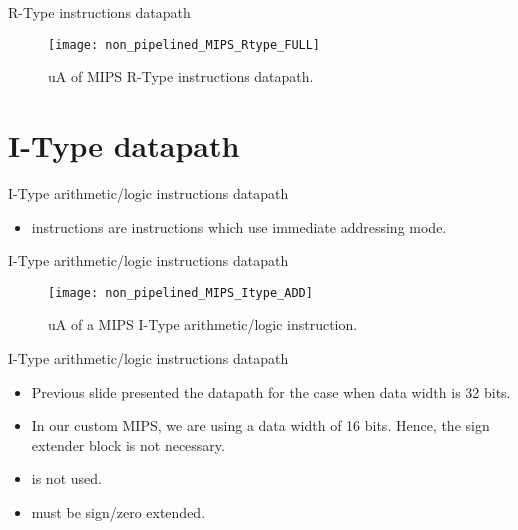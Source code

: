 % 
\begin{frame}{R-Type instructions datapath}
\vspace{-6.22pt}
  \begin{figure}
  \centering
  \texttt{[image: non\_pipelined\_MIPS\_Rtype\_FULL]}
  \vspace{-3pt}
  \caption{\ac{uA} of \ac{MIPS} R-Type instructions datapath.}
  \label{Figure:non_pipelined_MIPS_Rtype_FULL}
  \end{figure}
\end{frame}

\section{I-Type datapath}
% 
\begin{frame}{I-Type arithmetic/logic instructions datapath}
\begin{itemize}
\item \Itype instructions are instructions which use immediate addressing mode.
\

\end{itemize}

\end{frame}

% 
\begin{frame}{I-Type arithmetic/logic instructions datapath}
  \begin{figure}
  \centering
  \texttt{[image: non\_pipelined\_MIPS\_Itype\_ADD]}
  \vspace{-3pt}
  \caption{\ac{uA} of a \ac{MIPS} I-Type arithmetic/logic instruction.}
  \label{Figure:non_pipelined_MIPS_Itype_ADD}
  \end{figure}
\end{frame}


% 
\begin{frame}{I-Type arithmetic/logic instructions datapath}
\begin{itemize}
\item Previous slide presented the \Itype datapath for the case when data width is 32 bits.
\item In our custom \ac{MIPS}, we are using a data width of 16 bits. Hence, the sign extender block is not necessary.
\item {} is not used.
\item {} must be sign/zero extended. 
\end{itemize}
\end{frame}


